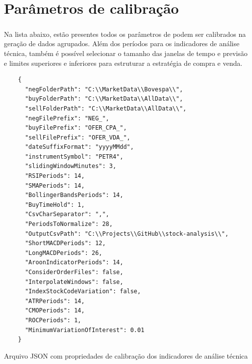 \documentclass[grad,numbers]{coppe}
\begin{document}
  \backmatter
  
  

  \appendix 
  \chapter{Parâmetros de calibração}\label{cap:params}
  
    \paragraph{}Na lista abaixo, estão presentes todos os parâmetros de podem ser calibrados na geração de dados agrupados. Além dos períodos para os indicadores de análise técnica, também é possível selecionar o tamanho das janelas de tempo e previsão e limites superiores e inferiores para estruturar a estratégia de compra e venda.
  
    \begin{listing}
    \begin{verbatim}
    {
      "negFolderPath": "C:\\MarketData\\Bovespa\\",
      "buyFolderPath": "C:\\MarketData\\AllData\\",
      "sellFolderPath": "C:\\MarketData\\AllData\\",
      "negFilePrefix": "NEG_",
      "buyFilePrefix": "OFER_CPA_",
      "sellFilePrefix": "OFER_VDA_",
      "dateSuffixFormat": "yyyyMMdd",
      "instrumentSymbol": "PETR4",
      "slidingWindowMinutes": 3,
      "RSIPeriods": 14,
      "SMAPeriods": 14,
      "BollingerBandsPeriods": 14,
      "BuyTimeHold": 1,
      "CsvCharSeparator": ",",
      "PeriodsToNormalize": 28,
      "OutputCsvPath": "C:\\Projects\\GitHub\\stock-analysis\\",
      "ShortMACDPeriods": 12,
      "LongMACDPeriods": 26,
      "AroonIndicatorPeriods": 14,
      "ConsiderOrderFiles": false,
      "InterpolateWindows": false,
      "IndexStockCodeVariation": false,
      "ATRPeriods": 14,
      "CMOPeriods": 14,
      "ROCPeriods": 1,
      "MinimumVariationOfInterest": 0.01
    }
    \end{verbatim}
    \caption{Arquivo JSON com propriedades de calibração dos indicadores de análise técnica} 
    \label{json-example}
    \end{listing}
    
\end{document}
